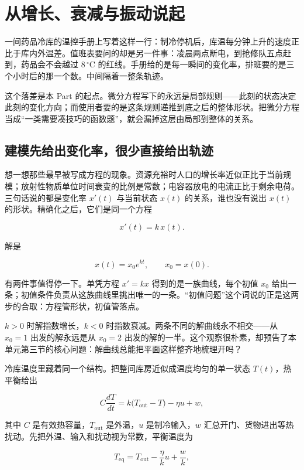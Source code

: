\section{从增长、衰减与振动说起}
\label{sec:15-Differential-Equations-and-Dynamical-Systems/01-ODE-Theory/01}

一间药品冷库的温控手册上写着这样一行：制冷停机后，库温每分钟上升的速度正比于库内外温差。值班表要问的却是另一件事：凌晨两点断电，到抢修队五点赶到，药品会不会越过 \(8\,^{\circ}\mathrm{C}\) 的红线。手册给的是每一瞬间的变化率，排班要的是三个小时后的那一个数。中间隔着一整条轨迹。

这个落差是本 Part 的起点。微分方程写下的永远是局部规则——此刻的状态决定此刻的变化方向；而使用者要的是这条规则递推到底之后的整体形状。把微分方程当成``一类需要凑技巧的函数题''，就会漏掉这层由局部到整体的关系。

\subsection{建模先给出变化率，很少直接给出轨迹}

想一想那些最早被写成方程的现象。资源充裕时人口的增长率近似正比于当前规模；放射性物质单位时间衰变的比例是常数；电容器放电的电流正比于剩余电荷。三句话说的都是变化率 \(x'(t)\) 与当前状态 \(x(t)\) 的关系，谁也没有说出 \(x(t)\) 的形状。精确化之后，它们是同一个方程

\[
x'(t)=k\,x(t).
\]

解是

\[
x(t)=x_0e^{kt},
\qquad x_0=x(0).
\]

有两件事值得停一下。单凭方程 \(x'=kx\) 得到的是一族曲线，每个初值 \(x_0\) 给出一条；初值条件负责从这族曲线里挑出唯一的一条。``初值问题''这个词说的正是这两步的合取：方程管形状，初值管落点。

\(k>0\) 时解指数增长，\(k<0\) 时指数衰减。两条不同的解曲线永不相交——从 \(x_0=1\) 出发的解永远是从 \(x_0=2\) 出发的解的一半。这个观察很朴素，却预告了本单元第三节的核心问题：解曲线总能把平面这样整齐地梳理开吗？

冷库温度里藏着同一个结构。把整间库房近似成温度均匀的单一状态 \(T(t)\)，热平衡给出

\[
C\frac{dT}{dt}
=k\bigl(T_{\mathrm{out}}-T\bigr)
-\eta u+w,
\]

其中 \(C\) 是有效热容量，\(T_{\mathrm{out}}\) 是外温，\(u\) 是制冷输入，\(w\) 汇总开门、货物进出等热扰动。先把外温、输入和扰动视为常数，平衡温度为

\[
T_{\mathrm{eq}}
=T_{\mathrm{out}}-\frac{\eta}{k}u+\frac{w}{k},
\]

